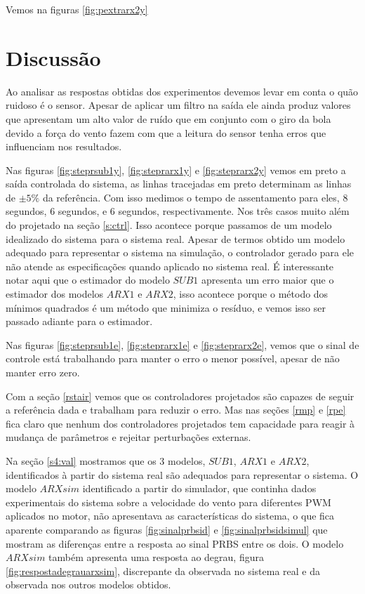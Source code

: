Vemos na figuras \ref{fig:pextrarx2y}


\section{Discussão}

Ao analisar as respostas obtidas dos experimentos devemos levar em conta o quão ruidoso é o sensor. Apesar de aplicar um filtro na saída ele ainda produz valores que apresentam um alto valor de ruído que em conjunto com o giro da bola devido a força do vento fazem com que a leitura do sensor tenha erros que influenciam nos resultados.


Nas figuras \ref{fig:steprsub1y}, \ref{fig:steprarx1y} e \ref{fig:steprarx2y} vemos em preto a saída controlada do sistema, as linhas tracejadas em preto determinam as linhas de $\pm5\%$ da referência. Com isso medimos o tempo de assentamento para eles, 8 segundos, 6 segundos, e 6 segundos, respectivamente. Nos três casos muito além do projetado na seção \ref{s:ctrl}. Isso acontece porque passamos de um modelo idealizado do sistema para o sistema real. Apesar de termos obtido um modelo adequado para representar o sistema na simulação, o controlador gerado para ele não atende as especificações quando aplicado no sistema real. É interessante notar aqui que o estimador do modelo $SUB1$ apresenta um erro maior que o estimador dos modelos $ARX1$ e $ARX2$, isso acontece porque o método dos mínimos quadrados é um método que minimiza o resíduo, e vemos isso ser passado adiante para o estimador.


Nas figuras \ref{fig:steprsub1e}, \ref{fig:steprarx1e} e \ref{fig:steprarx2e}, vemos que o sinal de controle está trabalhando para manter o erro o menor possível, apesar de não manter erro zero.


Com a seção \ref{rstair} vemos que os controladores projetados são capazes de seguir a referência dada e trabalham para reduzir o erro. Mas nas seções \ref{rmp} e \ref{rpe} fica claro que nenhum dos controladores projetados tem capacidade para reagir à mudança de parâmetros e rejeitar perturbações externas. 


Na seção \ref{s4:val} mostramos que os 3 modelos, $SUB1$, $ARX1$ e $ARX2$, identificados à partir do sistema real são adequados para representar o sistema. O modelo $ARXsim$ identificado a partir do simulador, que continha dados experimentais do sistema sobre a velocidade do vento para diferentes PWM aplicados no motor, não apresentava as características do sistema, o que fica aparente comparando as figuras \ref{fig:sinalprbsid} e \ref{fig:sinalprbsidsimul} que mostram as diferenças entre a resposta ao sinal PRBS entre os dois. O modelo $ARXsim$ também apresenta uma resposta ao degrau, figura \ref{fig:respostadegrauarxsim}, discrepante da observada no sistema real e da observada nos outros modelos obtidos.



